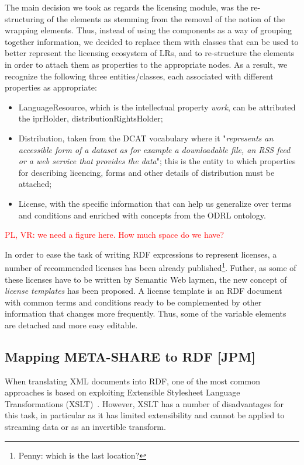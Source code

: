 \documentclass{llncs}
\begin{document}
{The main decision we took as regards the licensing module, was the re-structuring of the elements as stemming from the removal of the notion of the wrapping elements. Thus, instead of using the components as a way of grouping together information, we decided to replace them with classes that can be used to better represent the licensing ecosystem of LRs, and to re-structure the elements in order to attach them as properties to the appropriate nodes. As a result, we recognize the following three entities/classes, each associated with different properties as appropriate:
\begin{itemize}
\item LanguageResource, which is the intellectual property \textit{work}, can be attributed the iprHolder, distributionRightsHolder;
\item Distribution, taken from the DCAT vocabulary where it "\textit{represents an accessible form of a dataset as for example a downloadable file, an RSS feed or a web service that provides the data}"; this is the entity to which properties for describing licencing, forms and other details of distribution must be attached;
\item License, with the specific information that can help us generalize over terms and conditions and enriched with concepts from the ODRL ontology. 
\end{itemize}
\textcolor{red}{PL, VR: we need a figure here. How much space do we have?}

In order to ease the task of writing RDF expressions to represent licenses, a number of recommended licenses has been already published\footnote{Penny: which is the last location?}. Futher, as some of these licenses have to be written by Semantic Web laymen, the new concept of \textit{license templates} has been proposed. A license template is an RDF document with common terms and conditions ready to be complemented by other information that changes more frequently. Thus, some of the variable elements are detached and more easy editable.

\subsection{Mapping META-SHARE to RDF [JPM]}

\label{sec:conversion}

When translating XML documents into RDF, one of the most common approaches is
based on exploiting Extensible Stylesheet Language Transformations
(XSLT)~\cite{wustner2002converting,van2008xml,borin2014representing}. However, XSLT has a number of disadvantages
for this task, in particular as it has limited extensibility and cannot be
applied to streaming data or as an invertible transform.

}
\end{document}
